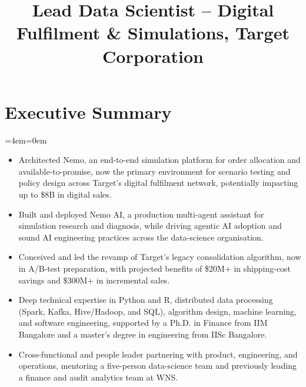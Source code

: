 \documentclass[11pt,a4paper]{moderncv}
\title{\Large Lead Data Scientist -- Digital Fulfilment \& Simulations, Target Corporation}
\begin{document}
\makecvtitle

\newenvironment{smallblockquote}{
  \par
  \medskip
  \leftskip=2em\rightskip=0em
  \noindent\ignorespaces
  }{\par\medskip}

\newenvironment{blockquote}{
  \par
  \medskip
  \leftskip=4em\rightskip=0em
  \noindent\ignorespaces
  }{\par\medskip}

\hypertarget{executive-summary}{
\section{Executive Summary}\label{executive-summary}}

\begingroup
  \par
  \medskip
  \leftskip=4em\rightskip=0em
  \noindent\ignorespaces

\begin{itemize}
    \item Architected Nemo, an end-to-end simulation platform for order allocation and available-to-promise, now the primary environment for scenario testing and policy design across Target's digital fulfilment network, potentially impacting up to \$8B in digital sales.
    \item Built and deployed Nemo AI, a production multi-agent assistant for simulation research and diagnosis, while driving agentic AI adoption and sound AI engineering practices across the data-science organisation.
    \item Conceived and led the revamp of Target's legacy consolidation algorithm, now in A/B-test preparation, with projected benefits of \$20M+ in shipping-cost savings and \$300M+ in incremental sales.
    \item Deep technical expertise in Python and R, distributed data processing (Spark, Kafka, Hive/Hadoop, and SQL), algorithm design, machine learning, and software engineering, supported by a Ph.D. in Finance from IIM Bangalore and a master's degree in engineering from IISc Bangalore.
    \item Cross-functional and people leader partnering with product, engineering, and operations, mentoring a five-person data-science team and previously leading a finance and audit analytics team at WNS.
\end{itemize}

  \par\medskip
\endgroup
\end{document}
